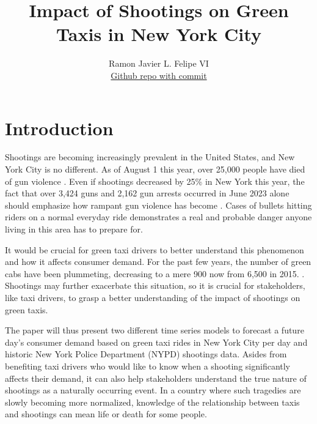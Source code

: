 \documentclass[11pt]{article}
\title{\textbf{Impact of Shootings on Green Taxis in New York City}}
\author{
Ramon Javier L. Felipe VI \\
\href{https://github.com/raja-felipe/taxi-crime-analysis}{Github repo with commit}
}
\begin{document}
\maketitle

\section{Introduction}
Shootings are becoming increasingly prevalent in the United States, and New York City is no different. As of August 1 this year, over 25,000 people have died of gun violence \cite{2023shootings}. Even if shootings decreased by 25\% in New York this year, the fact that over 3,424 guns and 2,162 gun arrests occurred in June 2023 alone should emphasize how rampant gun violence has become \cite{nyc25}. Cases of bullets hitting riders on a normal everyday ride demonstrates a real and probable danger anyone living in this area has to prepare for\cite{friendshooting}. 

It would be crucial for green taxi drivers to better understand this phenomenon and how it affects consumer demand. For the past few years, the number of green cabs have been plummeting, decreasing to a mere 900 now from 6,500 in 2015. \cite{greenlose}. Shootings may further exacerbate this situation, so it is crucial for stakeholders, like taxi drivers, to grasp a better understanding of the impact of shootings on green taxis. 

The paper will thus present two different time series models to forecast a future day's consumer demand based on green taxi rides in New York City per day and historic New York Police Department (NYPD) shootings data. Asides from benefiting taxi drivers who would like to know when a shooting significantly affects their demand, it can also help stakeholders understand the true nature of shootings as a naturally occurring event. In a country where such tragedies are slowly becoming more normalized, knowledge of the relationship between taxis and shootings can mean life or death for some people.

\end{document}
